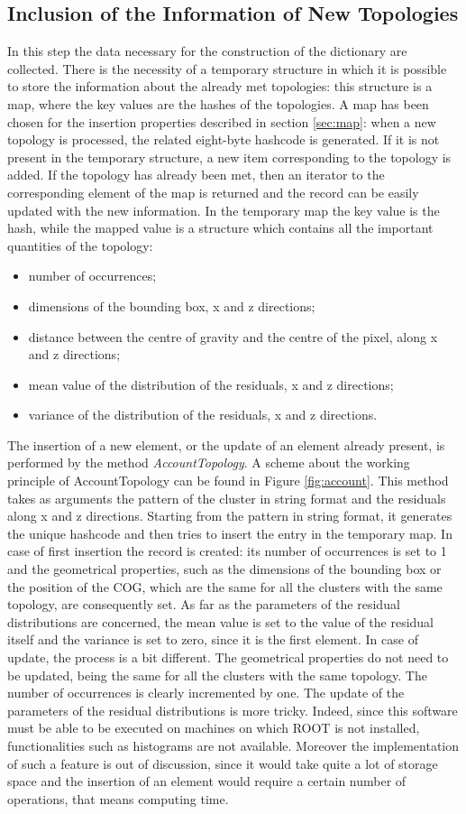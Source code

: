 \subsection{Inclusion of the Information of New Topologies}
In this step the data necessary for the construction of the dictionary are collected. There is the necessity of a temporary structure in which it is possible to store the information about the already met topologies: this structure is a map, where the key values are the hashes of the topologies.  A map has been chosen for the insertion properties described in section \ref{sec:map}: when a new topology is processed, the related eight-byte hashcode is generated. If it is not present in the temporary structure, a new item corresponding to the topology is added. If the topology has already been met, then an iterator to the corresponding element of the map is returned and the record can be easily updated with the new information. In the temporary map the key value is the hash, while the mapped value is a structure which contains all the important quantities of the topology:
\begin{itemize}
 \item number of occurrences;
 \item dimensions of the bounding box, x and z directions;
 \item distance between the centre of gravity and the centre of the pixel, along x and z directions;
 \item mean value of the distribution of the residuals, x and z directions;
 \item variance of the distribution of the residuals, x and z directions.
\end{itemize}
The insertion of a new element, or the update of an element already present, is performed by the method \textit{AccountTopology}. A scheme about the working principle of AccountTopology can be found in Figure \ref{fig:account}. This method takes as arguments the pattern of the cluster in string format and the residuals along x and z directions. Starting from the pattern in string format, it  generates the unique hashcode and then tries to insert the entry in the temporary map. In case of first insertion the record is created: its number of occurrences is set to 1 and the geometrical properties, such as the dimensions of the bounding box or the position of the COG, which are the same for all the clusters with the same topology, are consequently set. As far as the parameters of the residual distributions are concerned, the mean value is set to the value of the residual itself and the variance is set to zero, since it is the first element. In case of update, the process is a bit different. The geometrical properties do not need to be updated, being the same for all the clusters with the same topology. The number of occurrences is clearly incremented by one. The update of the parameters of the residual distributions is more tricky. Indeed, since this software must be able to be executed on machines on which ROOT is not installed, functionalities such as histograms are not available. Moreover the implementation of such a feature is out of discussion, since it would take quite a lot of storage space and the insertion of an element would require a certain number of operations, that means computing time.
